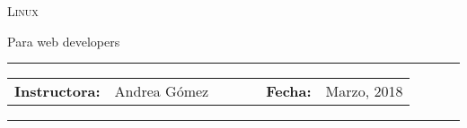 \documentclass[12pt, letter-paper]{article}
\begin{document}
\begin{center}
  {\Large \textsc{Linux}}
\end{center}
\begin{center}
  Para web developers
\end{center}

\begin{center}
  \rule{6in}{0.4pt}
  \begin{minipage}[t]{.75\textwidth}
    \begin{tabular}{llcccll}
      \textbf{Instructora:} & Andrea Gómez & & & &
                                                   \textbf{Fecha:} &  Marzo, 2018
    \end{tabular}
  \end{minipage}
  \rule{6in}{0.4pt}
\end{center}
\vspace{.5cm}
\setlength{\unitlength}{1in}
\renewcommand{\arraystretch}{2}
\end{document}
